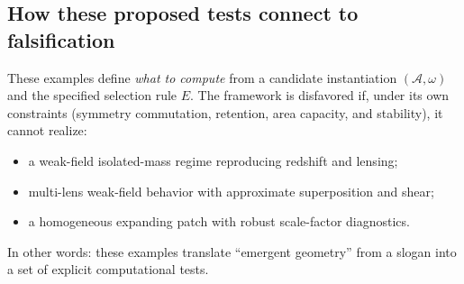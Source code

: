 \documentclass[reprint, amsmath, amssymb, aps, prd]{revtex4-2}
\begin{document}
\subsection{How these proposed tests connect to falsification}
These examples define \textit{what to compute} from a candidate instantiation $(\mathcal{A}, \omega)$ and the specified selection rule $E$. The framework is disfavored if, under its own constraints (symmetry commutation, retention, area capacity, and stability), it cannot realize:
\begin{itemize}
    \item a weak-field isolated-mass regime reproducing redshift and lensing;
    \item multi-lens weak-field behavior with approximate superposition and shear;
    \item a homogeneous expanding patch with robust scale-factor diagnostics.
\end{itemize}
In other words: these examples translate ``emergent geometry'' from a slogan into a set of explicit computational tests.
\end{document}
